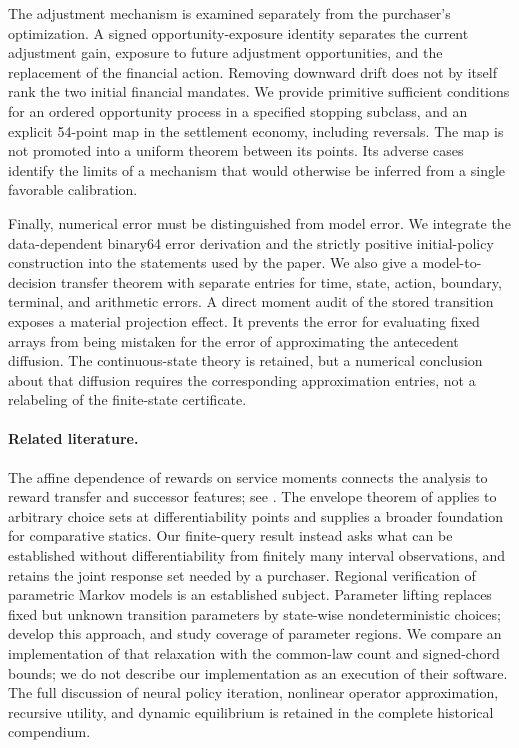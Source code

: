 The adjustment mechanism is examined separately from the purchaser's optimization. A signed opportunity-exposure identity separates the current adjustment gain, exposure to future adjustment opportunities, and the replacement of the financial action. Removing downward drift does not by itself rank the two initial financial mandates. We provide primitive sufficient conditions for an ordered opportunity process in a specified stopping subclass, and an explicit 54-point map in the settlement economy, including reversals. The map is not promoted into a uniform theorem between its points. Its adverse cases identify the limits of a mechanism that would otherwise be inferred from a single favorable calibration.

Finally, numerical error must be distinguished from model error. We integrate the data-dependent binary64 error derivation and the strictly positive initial-policy construction into the statements used by the paper. We also give a model-to-decision transfer theorem with separate entries for time, state, action, boundary, terminal, and arithmetic errors. A direct moment audit of the stored transition exposes a material projection effect. It prevents the error for evaluating fixed arrays from being mistaken for the error of approximating the antecedent diffusion. The continuous-state theory is retained, but a numerical conclusion about that diffusion requires the corresponding approximation entries, not a relabeling of the finite-state certificate.

\paragraph*{Related literature.}
The affine dependence of rewards on service moments connects the analysis to reward transfer and successor features; see \citet{alegre2022}. The envelope theorem of \citet{milgrom2002} applies to arbitrary choice sets at differentiability points and supplies a broader foundation for comparative statics. Our finite-query result instead asks what can be established without differentiability from finitely many interval observations, and retains the joint response set needed by a purchaser. Regional verification of parametric Markov models is an established subject. Parameter lifting replaces fixed but unknown transition parameters by state-wise nondeterministic choices; \citet{quatmann2016} develop this approach, and \citet{junges2019} study coverage of parameter regions. We compare an implementation of that relaxation with the common-law count and signed-chord bounds; we do not describe our implementation as an execution of their software. The full discussion of neural policy iteration, nonlinear operator approximation, recursive utility, and dynamic equilibrium is retained in the complete historical compendium.

